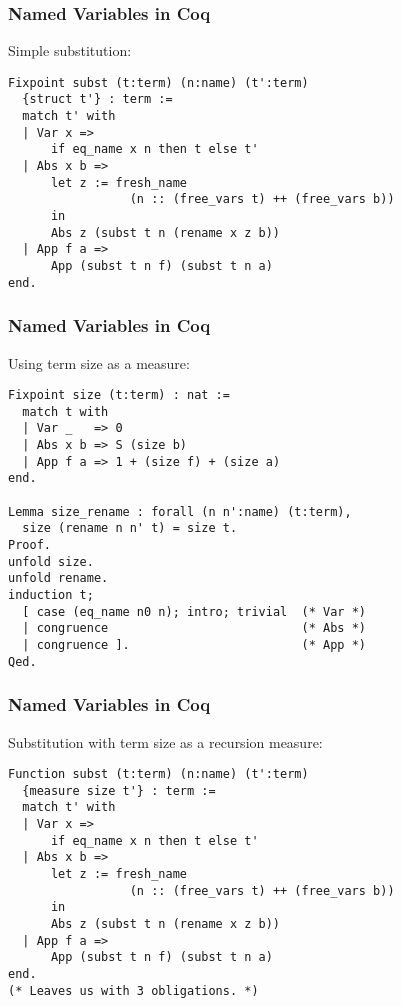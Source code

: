 \documentclass[notheorems]{beamer}
\begin{document}
\begin{frame}[fragile]

  \frametitle{Named Variables in Coq}

  Simple substitution:
  \begin{lstlisting}
Fixpoint subst (t:term) (n:name) (t':term)
  {struct t'} : term :=
  match t' with
  | Var x =>
      if eq_name x n then t else t'
  | Abs x b =>
      let z := fresh_name
                 (n :: (free_vars t) ++ (free_vars b))
      in
      Abs z (subst t n (rename x z b))
  | App f a =>
      App (subst t n f) (subst t n a)
end.
  \end{lstlisting}

\end{frame}


\begin{frame}[fragile]

  \frametitle{Named Variables in Coq}

  Using term size as a measure:
  \begin{lstlisting}
Fixpoint size (t:term) : nat :=
  match t with
  | Var _   => 0
  | Abs x b => S (size b)
  | App f a => 1 + (size f) + (size a)
end.

Lemma size_rename : forall (n n':name) (t:term),
  size (rename n n' t) = size t.
Proof.
unfold size.
unfold rename.
induction t;
  [ case (eq_name n0 n); intro; trivial  (* Var *)
  | congruence                           (* Abs *)
  | congruence ].                        (* App *)
Qed.
  \end{lstlisting}

\end{frame}




\begin{frame}[fragile]

  \frametitle{Named Variables in Coq}

  Substitution with term size as a recursion measure:
  \begin{lstlisting}
Function subst (t:term) (n:name) (t':term)
  {measure size t'} : term :=
  match t' with
  | Var x =>
      if eq_name x n then t else t'
  | Abs x b =>
      let z := fresh_name
                 (n :: (free_vars t) ++ (free_vars b))
      in
      Abs z (subst t n (rename x z b))
  | App f a =>
      App (subst t n f) (subst t n a)
end.
(* Leaves us with 3 obligations. *)
  \end{lstlisting}

\end{frame}
\end{document}
